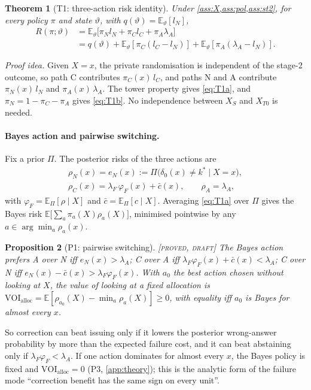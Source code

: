 \documentclass[10pt,twocolumn]{article}
\newtheorem{theorem}{Theorem}
\newtheorem{proposition}[theorem]{Proposition}
\theoremstyle{definition}
\theoremstyle{remark}
\newcommand{\status}[1]{\hfill{\footnotesize\upshape\textsc{[#1]}}}
\newcommand{\E}{\mathbb{E}}
\newcommand{\vt}{\vartheta}
\newcommand{\lA}{\lambda_A}
\newcommand{\lF}{\lambda_F}
\begin{document}
\begin{theorem}[T1: three-action risk identity]\label{thm:T1}
Under \cref{ass:X,ass:pol,ass:st2}, for every policy $\pi$ and state $\vt$, with $q(\vt)=\E_\vt[l_N]$,
\begin{align}
R(\pi;\vt)&=\E_\vt\bigl[\pi_Nl_N+\pi_Cl_C+\pi_A\lA\bigr]\label{eq:T1a}\\
&=q(\vt)+\E_\vt[\pi_C(l_C-l_N)]+\E_\vt[\pi_A(\lA-l_N)].\label{eq:T1b}
\end{align}
\end{theorem}
\noindent\emph{Proof idea.} Given $X=x$, the private randomisation is independent of the stage-2 outcome, so path C contributes $\pi_C(x)\,l_C$, and paths N and A contribute $\pi_N(x)\,l_N$ and $\pi_A(x)\,\lA$. The tower property gives \eqref{eq:T1a}, and $\pi_N=1-\pi_C-\pi_A$ gives \eqref{eq:T1b}. No independence between $X_S$ and $X_{T0}$ is needed.

\paragraph{Bayes action and pairwise switching.} Fix a prior $\Pi$. The posterior risks of the three actions are
\begin{gather*}
\rho_N(x)=e_N(x):=\Pi\bigl(\delta_0(x)\neq k^*\mid X=x\bigr),\\
\rho_C(x)=\lF\,\varphi_F(x)+\bar c(x),\qquad \rho_A=\lA,
\end{gather*}
with $\varphi_F=\E_\Pi[\rho\mid X]$ and $\bar c=\E_\Pi[c\mid X]$. Averaging \eqref{eq:T1a} over $\Pi$ gives the Bayes risk $\E\bigl[\sum_a\pi_a(X)\rho_a(X)\bigr]$, minimised pointwise by any $a\in\arg\min_a\rho_a(x)$.

\begin{proposition}[P1: pairwise switching]\label{prop:P1}\status{proved, draft}
The Bayes action prefers A over N iff $e_N(x)>\lA$; C over A iff $\lF\varphi_F(x)+\bar c(x)<\lA$; C over N iff $e_N(x)-\bar c(x)>\lF\varphi_F(x)$. With $a_0$ the best action chosen without looking at $X$, the value of looking at a fixed allocation is $\mathrm{VOI}_{\mathrm{alloc}}=\E[\rho_{a_0}(X)-\min_a\rho_a(X)]\ge0$, with equality iff $a_0$ is Bayes for almost every $x$.
\end{proposition}

So correction can beat issuing only if it lowers the posterior wrong-answer probability by more than the expected failure cost, and it can beat abstaining only if $\lF\varphi_F<\lA$. If one action dominates for almost every $x$, the Bayes policy is fixed and $\mathrm{VOI}_{\mathrm{alloc}}=0$ (P3, \cref{app:theory}); this is the analytic form of the failure mode ``correction benefit has the same sign on every unit''.
\end{document}
